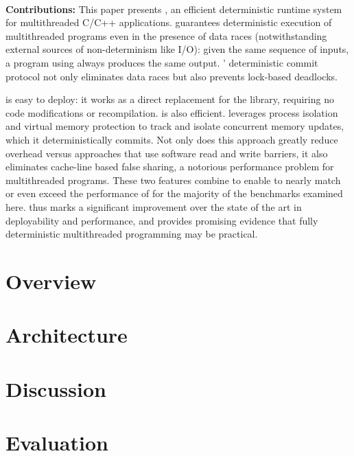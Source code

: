 \hspace{1em} \\
\noindent
\textbf{Contributions:}
This paper presents \textbf{\dthreads{}}, an efficient deterministic runtime system for multithreaded C/C++ applications. \dthreads{} guarantees deterministic execution of multithreaded programs even in the presence of data races (notwithstanding external sources of non-determinism
like I/O): given the same sequence of inputs, a program
using \dthreads{} always produces the same output. \dthreads{}'
deterministic commit protocol not only eliminates data races but also prevents lock-based deadlocks.

\dthreads{} is easy to deploy: it works as a direct replacement for the \pthreads{} library, requiring no code modifications or
recompilation. \dthreads{} is also efficient. \dthreads{} leverages process isolation and virtual memory protection to track and isolate concurrent memory updates, which it deterministically commits. Not only does this approach greatly reduce overhead versus approaches that use software read and write barriers, it also eliminates cache-line based false sharing, a notorious performance problem for multithreaded
programs. These two features combine to enable \dthreads{} to nearly match or even exceed the performance of \pthreads{} for the majority of the benchmarks examined here. \dthreads{} thus marks a significant improvement over the state of the art in deployability and performance, and provides promising evidence that fully deterministic multithreaded programming may be practical.

\section{\dthreads{} Overview}


\section{\dthreads{} Architecture}


\section{Discussion}


\section{Evaluation}

